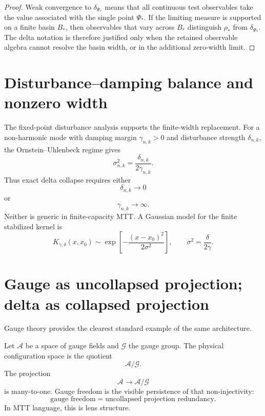 \documentclass[11pt]{article}
\begin{document}
\begin{proof}
Weak convergence to \(\delta_{\Psi_\ast}\) means that all continuous test observables take the
value associated with the single point \(\Psi_\ast\).  If the limiting measure is supported on
a finite basin \(B_\ast\), then observables that vary across \(B_\ast\) distinguish
\(\rho_\ast\) from \(\delta_{\Psi_\ast}\).  The delta notation is therefore justified only when
the retained observable algebra cannot resolve the basin width, or in the additional
zero-width limit.
\end{proof}

\section{Disturbance--damping balance and nonzero width}

The fixed-point disturbance analysis supports the finite-width replacement.  For a
non-harmonic mode with damping margin \(\gamma_{n,k}>0\) and disturbance strength
\(\delta_{n,k}\), the Ornstein--Uhlenbeck regime gives
\begin{equation}
\sigma^2_{n,k}=\frac{\delta_{n,k}}{2\gamma_{n,k}}.
\end{equation}
Thus exact delta collapse requires either
\begin{equation}
\delta_{n,k}\to 0
\end{equation}
or
\begin{equation}
\gamma_{n,k}\to\infty.
\end{equation}
Neither is generic in finite-capacity MTT.  A Gaussian model for the finite stabilized kernel is
\begin{equation}
K_{\gamma,\delta}(x,x_0)\sim
\exp\left[-\frac{(x-x_0)^2}{2\sigma^2}\right],
\qquad
\sigma^2=\frac{\delta}{2\gamma}.
\end{equation}

\section{Gauge as uncollapsed projection; delta as collapsed projection}

Gauge theory provides the clearest standard example of the same architecture.

Let \(\mathcal A\) be a space of gauge fields and \(\mathcal G\) the gauge group.  The
physical configuration space is the quotient
\begin{equation}
\mathcal A/\mathcal G.
\end{equation}
The projection
\begin{equation}
\mathcal A\to\mathcal A/\mathcal G
\end{equation}
is many-to-one.  Gauge freedom is the visible persistence of that non-injectivity:
\[
\boxed{\text{gauge freedom}=\text{uncollapsed projection redundancy}.}
\]
In MTT language, this is lens structure.
\end{document}
